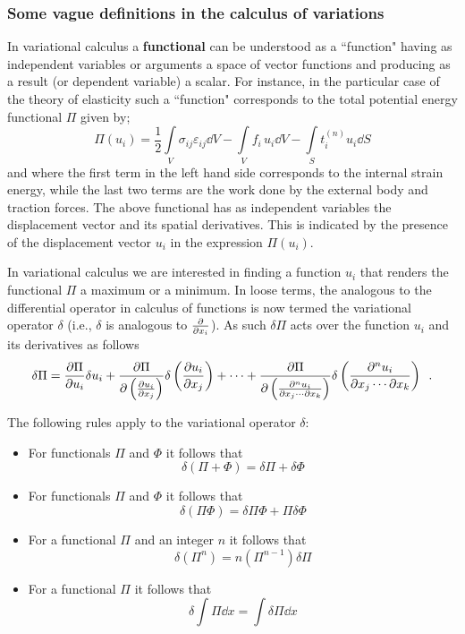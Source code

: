 \subsubsection*{Some vague definitions in the calculus of variations}
In variational calculus a {\bf functional} can be understood as a ``function" having as independent variables or arguments a space of vector functions and producing as a result (or dependent variable) a scalar. For instance, in the particular case of the theory of elasticity such a ``function" corresponds to the total potential energy functional $\Pi$ given by;
\begin{equation}\label{eq:Potential}
    \Pi(u_i) = \frac{1}{2}\int\limits_V \sigma_{ij}\varepsilon_{ij}\dd V  - \int\limits_V f_i\, u_i\dd V  - \int\limits_S t_i^{(n)} u_i\dd S
\end{equation}
and where the first term in the left hand side corresponds to the internal strain energy, while the last two terms are the work done by the external body and traction forces. The above functional has as independent variables the displacement vector and its spatial derivatives. This is indicated by the presence of the displacement vector $u_i$ in the expression $\Pi(u_i)$.

In variational calculus we are interested in finding a function $u_i$ that renders the functional $\Pi$ a maximum or a minimum. In loose terms, the analogous to the differential operator in calculus of functions is now termed the variational operator $\delta$ (i.e., $\delta$ is analogous to $\pdv{x_i}$). As such $\delta\Pi$ acts over the function $u_i$ and its derivatives as follows
\[\delta \Pi  = \pdv{\Pi}{u_i}\delta u_i + \pdv{\Pi}{\left( \pdv{u_i}{x_j}\right)} \delta\left(\pdv{u_i}{x_j}\right) + \cdots + \pdv{\Pi}{\left( \pdv{^{n}u_i}{x_j \cdots \partial x_k}\right)} \delta\left( \pdv{^{n}u_i}{x_j \cdots \partial x_k}\right) \enspace .\]

The following rules apply to the variational operator $\delta$:
\begin{itemize}
\item For functionals $\Pi$ and $\Phi$ it follows that \[\delta (\Pi  + \Phi ) = \delta \Pi  + \delta \Phi \]
\item For functionals $\Pi$ and $\Phi$ it follows that \[\delta (\Pi \Phi ) = \delta \Pi \Phi  + \Pi \delta \Phi \]
\item For a functional $\Pi$ and an integer $n$ it follows that \[\delta ({\Pi ^n}) = n({\Pi ^{n - 1}})\delta \Pi \]
\item For a functional $\Pi$ it follows that \[\delta \int {\Pi \dd x}  = \int {\delta \Pi \dd x} \]
\end{itemize}

